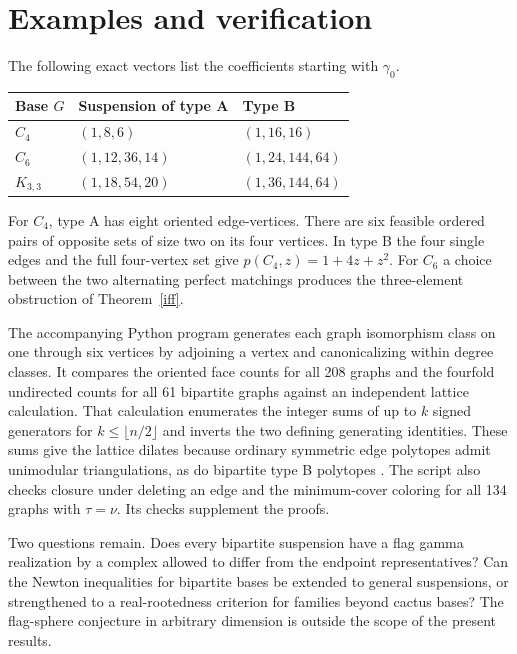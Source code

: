 \documentclass[11pt]{article}
\begin{document}
\section{Examples and verification}
The following exact vectors list the coefficients starting with $\gamma_0$.
\begin{center}
\begin{tabular}{lll}
\toprule
Base $G$ & Suspension of type A & Type B\\\midrule
$C_4$ & $(1,8,6)$ & $(1,16,16)$\\
$C_6$ & $(1,12,36,14)$ & $(1,24,144,64)$\\
$K_{3,3}$ & $(1,18,54,20)$ & $(1,36,144,64)$\\
\bottomrule
\end{tabular}
\end{center}
For $C_4$, type A has eight oriented edge-vertices. There are six feasible ordered pairs of opposite sets of size two on its four vertices. In type B the four single edges and the full four-vertex set give $p(C_4,z)=1+4z+z^2$. For $C_6$ a choice between the two alternating perfect matchings produces the three-element obstruction of Theorem~\ref{iff}.

The accompanying Python program generates each graph isomorphism class on one through six vertices by adjoining a vertex and canonicalizing within degree classes. It compares the oriented face counts for all 208 graphs and the fourfold undirected counts for all 61 bipartite graphs against an independent lattice calculation. That calculation enumerates the integer sums of up to $k$ signed generators for $k\le\lfloor n/2\rfloor$ and inverts the two defining generating identities. These sums give the lattice dilates because ordinary symmetric edge polytopes admit unimodular triangulations, as do bipartite type B polytopes \cite{OT,HJM}. The script also checks closure under deleting an edge and the minimum-cover coloring for all 134 graphs with $\tau=\nu$. Its checks supplement the proofs.

Two questions remain. Does every bipartite suspension have a flag gamma realization by a complex allowed to differ from the endpoint representatives? Can the Newton inequalities for bipartite bases be extended to general suspensions, or strengthened to a real-rootedness criterion for families beyond cactus bases? The flag-sphere conjecture in arbitrary dimension is outside the scope of the present results.
\end{document}

